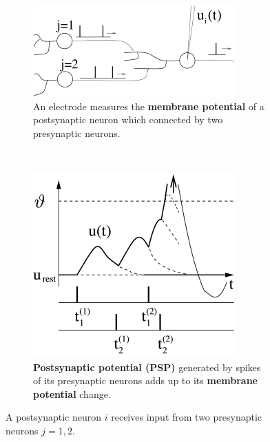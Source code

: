 \begin{figure}[tbh!]
	\centering
	\begin{subfigure}[t]{0.7\textwidth}
		\includegraphics[width=\textwidth]{pics_snn/x10.png}
		\caption{An electrode measures the \textbf{membrane potential} of a postsynaptic neuron which connected by two presynaptic neurons.}
	\end{subfigure}\\
	\begin{subfigure}[t]{0.6\textwidth}
		\includegraphics[width=\textwidth]{pics_snn/x11.png}
		\caption{\textbf{Postsynaptic potential (PSP)} generated by spikes of its presynaptic neurons adds up to its \textbf{membrane potential} change. }
	\end{subfigure}
	\caption{A postsynaptic neuron $i$ receives input from two presynaptic neurons $j=1,2$.}
	\label{Fig:neural_dynamics}
\end{figure}

